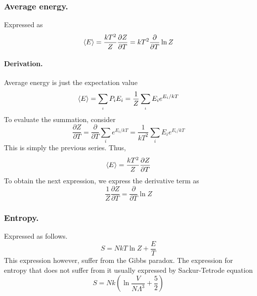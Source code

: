 \documentclass[../../../Main.tex]{subfiles}
\begin{document}
\subsubsection*{Average energy.} Expressed as
\begin{equation*}
    \braket{E}=\frac{kT^2}{Z}\frac{\partial Z}{\partial T}=kT^2\frac{\partial}{\partial T}\ln Z
\end{equation*}

\paragraph*{Derivation.} Average energy is just the expectation value
\begin{equation*}
    \braket{E}=\sum_{_i}P_iE_i=\frac{1}{Z}\sum_{_i}E_ie^{E_i/kT}
\end{equation*}
To evaluate the summation, consider
\begin{equation*}
    \frac{\partial Z}{\partial T}=\frac{\partial}{\partial T}\sum_i e^{E_i/kT}=\frac{1}{kT^2}\sum_i E_ie^{E_i/kT}
\end{equation*}
This is simply the previous series. Thus,
\begin{equation*}
    \braket{E}=\frac{kT^2}{Z}\frac{\partial Z}{\partial T}
\end{equation*}
To obtain the next expression, we express the derivative term as
\begin{equation*}
    \frac{1}{Z}\frac{\partial Z}{\partial T}=\frac{\partial }{\partial T}\ln Z
\end{equation*}


\subsubsection*{Entropy.} Expressed as follows.
\begin{equation*}
    S=NkT\ln Z+\frac{E}{T}
\end{equation*}
This expression however, suffer from the Gibbs paradox. The expression for entropy that does not suffer from it usually expressed by Sackur-Tetrode equation
\begin{equation*}
    S=Nk\left(\ln\frac{V}{N\Lambda^3}+\frac{5}{2}\right)
\end{equation*}
\end{document}
